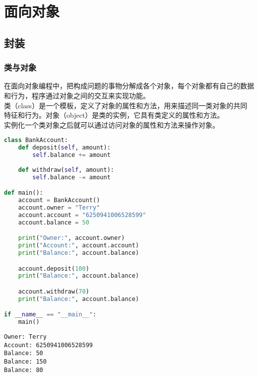 \chapter{面向对象}

\section{封装}

\subsection{类与对象}

在面向对象编程中，把构成问题的事物分解成各个对象，每个对象都有自己的数据和行为，程序通过对象之间的交互来实现功能。\\

类（class）是一个模板，定义了对象的属性和方法，用来描述同一类对象的共同特征和行为。对象（object）是类的实例，它具有类定义的属性和方法。\\

实例化一个类对象之后就可以通过访问对象的属性和方法来操作对象。\\


\begin{lstlisting}[language=Python]
class BankAccount:
    def deposit(self, amount):
        self.balance += amount
    
    def withdraw(self, amount):
        self.balance -= amount

def main():
    account = BankAccount()
    account.owner = "Terry"
    account.account = "6250941006528599"
    account.balance = 50

    print("Owner:", account.owner)
    print("Account:", account.account)
    print("Balance:", account.balance)

    account.deposit(100)
    print("Balance:", account.balance)

    account.withdraw(70)
    print("Balance:", account.balance)

if __name__ == "__main__":
    main()
\end{lstlisting}

\begin{tcolorbox}
    \begin{verbatim}
Owner: Terry
Account: 6250941006528599
Balance: 50
Balance: 150
Balance: 80
\end{verbatim}
\end{tcolorbox}

